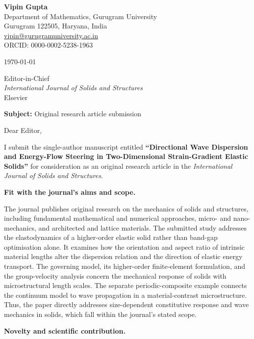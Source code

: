 \documentclass[10pt,a4paper]{article}
\begin{document}
\noindent\textbf{Vipin Gupta}\\
Department of Mathematics, Gurugram University\\
Gurugram 122505, Haryana, India\\
\href{mailto:vipin@gurugramuniversity.ac.in}{vipin@gurugramuniversity.ac.in}\\
ORCID: 0000-0002-5238-1963

\medskip
\today

\medskip
Editor-in-Chief\\
\textit{International Journal of Solids and Structures}\\
Elsevier

\medskip
\textbf{Subject:} Original research article submission

Dear Editor,

I submit the single-author manuscript entitled \textbf{\textquotedblleft Directional Wave Dispersion and Energy-Flow Steering in Two-Dimensional Strain-Gradient Elastic Solids\textquotedblright} for consideration as an original research article in the \textit{International Journal of Solids and Structures}.

\textbf{Fit with the journal's aims and scope.}

The journal publishes original research on the mechanics of solids and structures, including fundamental mathematical and numerical approaches, micro- and nano-mechanics, and architected and lattice materials. The submitted study addresses the elastodynamics of a higher-order elastic solid rather than band-gap optimisation alone. It examines how the orientation and aspect ratio of intrinsic material lengths alter the dispersion relation and the direction of elastic energy transport. The governing model, its higher-order finite-element formulation, and the group-velocity analysis concern the mechanical response of solids with microstructural length scales. The separate periodic-composite example connects the continuum model to wave propagation in a material-contrast microstructure. Thus, the paper directly addresses size-dependent constitutive response and wave mechanics in solids, which fall within the journal's stated scope.

\textbf{Novelty and scientific contribution.}
\end{document}
